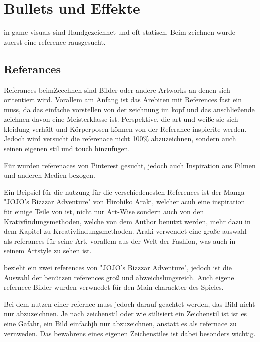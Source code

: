 
\section{Bullets und Effekte}\label{sec:bullets-und-effekte}

\renewcommand{\kapitelautor}{Autor: Philip Jankovic}


\FF in game visuals sind Handgezeichnet und oft statisch. Beim zeichnen wurde zuerst eine reference rausgesucht.


\subsection{Referances}\label{subsec:references}
Referances beimZecchnen sind Bilder oder andere Artworks an denen sich oritentiert wird. Vorallem am Anfang ist das
Arebiten mit References fast ein muss, da das einfache vorstellen von der zeichnung im kopf und das anschließende zeichnen davon eine Meisterklasse ist.
Perspektive, die art und weiße sie sich kleidung verhält und Körperposen können von der Referance inspierite werden.
Jedoch wird versucht die referenace nicht 100\% abzuzeichnen, sondern auch seinen eigenen stil und touch hinzufügen. \cite{referance}


Für \FF wurden referenaces von Pinterest gesucht, jedoch auch Inspiration aus Filmen und anderen Medien bezogen.


Ein Beipsiel für die nutzung für die verschiedenesten References ist der Manga "JOJO's Bizzzar Adventure" von Hirohiko Araki\cite{jojo},
welcher acuh eine inspiration für einige Teile von \FF ist, nicht nur Art-Wise sondern auch von den Krativfindungsmethoden, welche von dem Author benützt werden, mehr dazu in dem
Kapitel zu Kreativfindungsmethoden. %
Araki verwendet eine große auswahl als referances für seine Art, vorallem aus der Welt
der Fashion, was auch in seinem Artstyle zu sehen ist.


\FF bezieht ein zwei references von "JOJO's Bizzzar Adventure", jedoch ist die Auswahl der benützen references groß und abweichslungsreich.
Auch eigene refernece Bilder wurden verwnedet für den Main charackter des Spieles.


Bei dem nutzen einer refernce muss jedoch darauf geachtet werden, das Bild nicht nur abzuzeichnen. Je nach zeichenstil
oder wie stilisiert ein Zeichenstil ist ist es eine Gafahr, ein  Bild einfachjh nur abzuzeichnen, anstatt es als refernace zu vernweden.
Das bewahrens eines eigenen Zeichenstiles ist dabei besonders wichtig.



